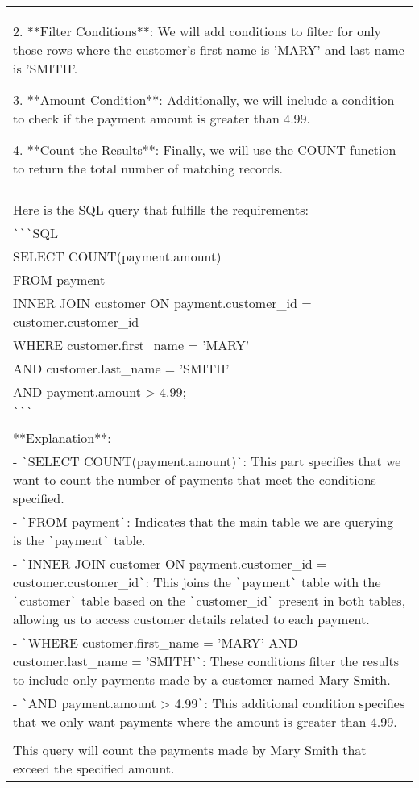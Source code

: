 \begin{table*}[htbp]
\begin{tcolorbox}[
    colback=white, %
    colframe=black, %
    title=Response, %
    fonttitle=\bfseries, %
    width=\textwidth, %
    boxrule=1pt, %
    rounded corners, %
]
\begin{tabularx}{\textwidth}{X}
2. **Filter Conditions**: We will add conditions to filter for only those rows where the customer's first name is 'MARY' and last name is 'SMITH'.

3. **Amount Condition**: Additionally, we will include a condition to check if the payment amount is greater than 4.99.

4. **Count the Results**: Finally, we will use the COUNT function to return the total number of matching records.
\\ \\
Here is the SQL query that fulfills the requirements:
\\ 
\verb|`|\verb|`|\verb|`|SQL \\
SELECT COUNT(payment.amount) \\ 
FROM payment \\ 
INNER JOIN customer ON payment.customer\_id = customer.customer\_id \\
WHERE customer.first\_name = 'MARY' \\
AND customer.last\_name = 'SMITH' \\
AND payment.amount > 4.99; \\
\verb|`|\verb|`|\verb|`|
\\ \\ 
**Explanation**: \\
- \verb|`|SELECT COUNT(payment.amount)\verb|`|: This part specifies that we want to count the number of payments that meet the conditions specified. \\
- \verb|`|FROM payment\verb|`|: Indicates that the main table we are querying is the \verb|`|payment\verb|`| table. \\
- \verb|`|INNER JOIN customer ON payment.customer\_id = customer.customer\_id\verb|`|: This joins the \verb|`|payment\verb|`| table with the \verb|`|customer\verb|`| table based on the \verb|`|customer\_id\verb|`| present in both tables, allowing us to access customer details related to each payment. \\
- \verb|`|WHERE customer.first\_name = 'MARY' AND customer.last\_name = 'SMITH'\verb|`|: These conditions filter the results to include only payments made by a customer named Mary Smith. \\
- \verb|`|AND payment.amount > 4.99\verb|`|: This additional condition specifies that we only want payments where the amount is greater than 4.99.
\\ \\
This query will count the payments made by Mary Smith that exceed the specified amount.


\end{tabularx}
\end{tcolorbox}
\end{table*}
